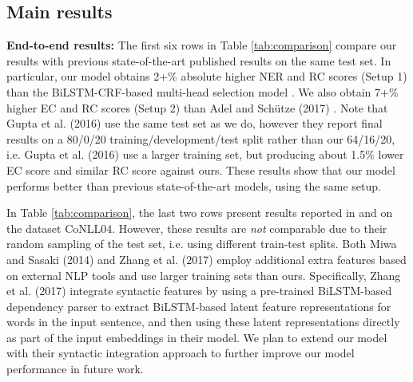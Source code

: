 \documentclass[runningheads]{llncs}
\begin{document}
\subsection{Main results}

\textbf{End-to-end results:} The first six rows in Table \ref{tab:comparison} compare our  results with previous  state-of-the-art published results on the same test set.  In particular, our model obtains 2+\% absolute higher NER and RC scores (Setup 1) than the BiLSTM-CRF-based multi-head selection  model \cite{BEKOULIS201834}. We also obtain 7+\% higher EC and RC scores (Setup 2) than Adel and Sch\"utze (2017) \cite{adel-schutze:2017:EMNLP2017}.  Note that Gupta et al. (2016)  \cite{gupta-schutze-andrassy:2016:COLING}  use the same test set as we do, however they report final results on a 80/0/20 training/development/test split rather than our {64/16/20}, i.e.  Gupta et al. (2016)  use a larger training set, but producing about 1.5\% lower EC score and similar RC score against ours.  These  results show that our model performs better than previous state-of-the-art  models, using the same  setup.

In Table \ref{tab:comparison}, the last two rows  present results reported in \cite{miwa-sasaki:2014:EMNLP2014} and \cite{zhang-zhang-fu:2017:EMNLP2017} on the  dataset CoNLL04. However, these results are \textit{not} comparable due to their random sampling of the test set, i.e. using different train-test splits.   
Both Miwa and Sasaki (2014)  \cite{miwa-sasaki:2014:EMNLP2014} 
and Zhang et al. (2017) \cite{zhang-zhang-fu:2017:EMNLP2017} 
employ additional extra features based on external NLP tools and use larger training sets than ours. Specifically, Zhang et al. (2017) integrate syntactic features by using a pre-trained BiLSTM-based  dependency parser to extract BiLSTM-based latent feature representations for words in the input  sentence,  and then using these latent representations directly as part of the input embeddings in their model. We plan to extend our model with their  syntactic integration approach to further improve our model performance in future work.
\end{document}

